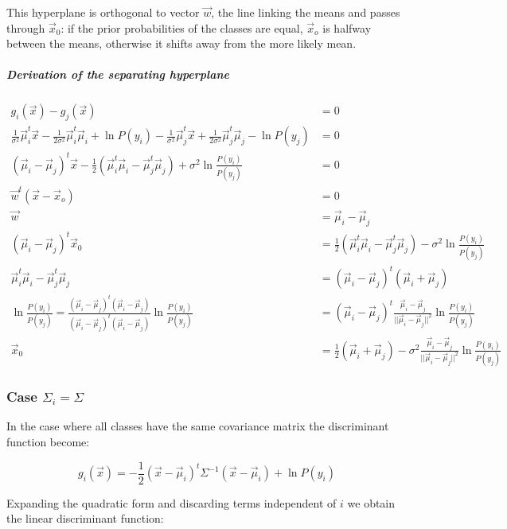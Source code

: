 			This hyperplane is orthogonal to vector $\vec{w}$, the line linking the means and passes through $\vec{x}_0$: if the prior probabilities of the classes are equal, $\vec{x}_o$ is halfway between the means, otherwise it shifts away from the more likely mean.

				\subparagraph{Derivation of the separating hyperplane}

				\begin{align*}
					g_i(\vec{x}) - g_j(\vec{x}) &= 0\\
					\frac{1}{\sigma^2}\vec{\mu}_i^t\vec{x}-\frac{1}{2\sigma^2}\vec{\mu}_i^t\vec{\mu}_i + \ln P(y_i) - \frac{1}{\sigma^2}\vec{\mu}_j^t\vec{x} + \frac{1}{2\sigma^2}\vec{\mu}_j^t\vec{\mu}_j - \ln P(y_j) & = 0\\
					 (\vec{\mu}_i-\vec{\mu}_j)^t\vec{x} - \frac{1}{2}(\vec{\mu}_i^t\vec{\mu}_i-\vec{\mu}_j^t\vec{\mu}_j)+\sigma^2\ln\frac{P(y_i)}{P(y_j)} &=0\\
					 \vec{w}^t(\vec{x}-\vec{x}_o) & = 0\\
					 \vec{w} &= \vec{\mu}_i-\vec{\mu}_j\\
					 (\vec{\mu}_i - \vec{\mu}_j)^t\vec{x}_0 &=\frac{1}{2}(\vec{\mu}_i^t\vec{\mu}_i - \vec{\mu}_j^t\vec{\mu}_j) - \sigma^2\ln\frac{P(y_i)}{P(y_j)}\\
					 \vec{\mu}_i^t\vec{\mu}_i - \vec{\mu}_j^t\vec{\mu}_j &= (\vec{\mu}_i - \vec{\mu}_j)^t(\vec{\mu}_i + \vec{\mu}_j)\\
					 \ln\frac{P(y_i)}{P(y_j)} = \frac{(\vec{\mu}_i -\vec{\mu}_j)^t(\vec{\mu}_i - \vec{\mu}_j)}{(\vec{\mu}_i -\vec{\mu}_j)^t(\vec{\mu}_i - \vec{\mu}_j)}\ln\frac{P(y_i)}{P(y_j)} &= (\vec{\mu}_i - \vec{\mu}_j)^t\frac{\vec{\mu}_i-\vec{\mu}_j}{||\vec{\mu}_i-\vec{\mu}_j||^2}\ln\frac{P(y_i)}{P(y_j)}\\
					\vec{x}_0 &= \frac{1}{2}(\vec{\mu}_i + \vec{\mu}_j) - \sigma^2 \frac{\vec{\mu}_i-\vec{\mu}_j}{||\vec{\mu}_i-\vec{\mu}_j||^2}\ln\frac{P(y_i)}{P(y_j)}
				\end{align*}

		\subsubsection{Case $\Sigma_i = \Sigma$}
		In the case where all classes have the same covariance matrix the discriminant function become:

		$$g_i(\vec{x}) = -\frac{1}{2}(\vec{x}-\vec{\mu}_i)^t\Sigma^{-1}(\vec{x}-\vec{\mu}_i) + \ln P(y_i)$$

		Expanding the quadratic form and discarding terms independent of $i$ we obtain the linear discriminant function:

